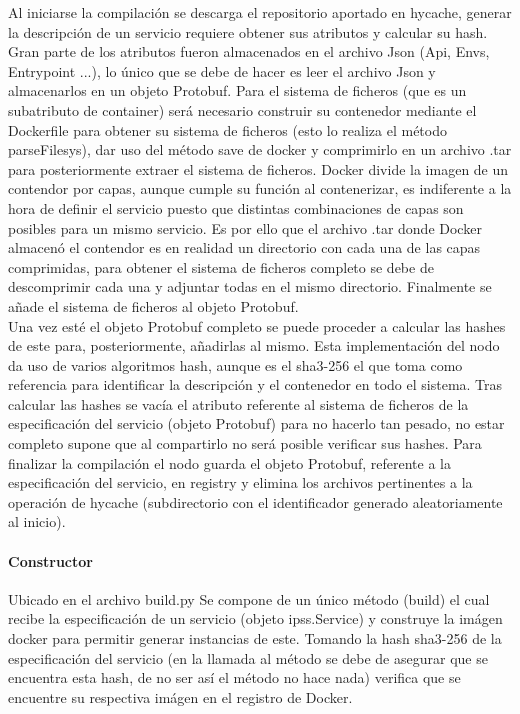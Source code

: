 \documentclass[11pt]{article}
\begin{document}
				Al iniciarse la compilación se descarga el repositorio aportado en hycache, generar la descripción de un servicio requiere obtener sus atributos y calcular su hash.
				Gran parte de los atributos fueron almacenados en el archivo Json (Api, Envs, Entrypoint ...), lo único que se debe de hacer es leer el archivo Json y almacenarlos en un objeto Protobuf.
				Para el sistema de ficheros (que es un subatributo de container) será necesario construir su contenedor mediante el Dockerfile
				para obtener su sistema de ficheros (esto lo realiza el método parseFilesys), dar uso del método save de docker y comprimirlo en un archivo .tar para posteriormente extraer el sistema de ficheros.
				Docker divide la imagen de un contendor por capas, aunque cumple su función al contenerizar, es indiferente a la hora de definir el servicio puesto que distintas combinaciones de capas son posibles para un mismo servicio.
				Es por ello que el archivo .tar donde Docker almacenó el contendor es en realidad un directorio con cada una de las capas comprimidas, para obtener el sistema de ficheros completo se debe de descomprimir cada una y 
				adjuntar todas en el mismo directorio. Finalmente se añade el sistema de ficheros al objeto Protobuf. \\
				Una vez esté el objeto Protobuf completo se puede proceder a calcular las hashes de este para, posteriormente, añadirlas al mismo. Esta implementación del nodo da uso de varios algoritmos hash, 
				aunque es el sha3-256 el que toma como referencia para identificar la descripción y el contenedor en todo el sistema. 
				Tras calcular las hashes se vacía el atributo referente al sistema de ficheros de la especificación del servicio (objeto Protobuf) para no hacerlo
				tan pesado, no estar completo supone que al compartirlo no será posible verificar sus hashes.
				Para finalizar la compilación el nodo guarda el objeto Protobuf, referente a la especificación del servicio, en registry y elimina los archivos pertinentes a la operación de hycache (subdirectorio con el identificador generado
				aleatoriamente al inicio).

			\paragraph{Constructor}
				Ubicado en el archivo build.py
				Se compone de un único método (build) el cual recibe la especificación de un servicio (objeto ipss.Service) y construye la imágen docker para permitir generar instancias de este. Tomando la hash sha3-256 de
				la especificación del servicio (en la llamada al método se debe de asegurar que se encuentra esta hash, de no ser así el método no hace nada) verifica que se encuentre su respectiva imágen en el registro de Docker. \\
\end{document}
